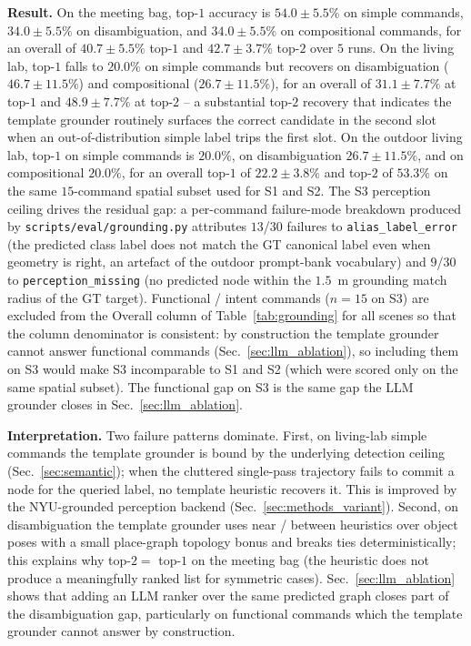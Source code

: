 \noindent\textbf{Result.}
On the meeting bag, top-$1$ accuracy is $54.0 \pm 5.5\%$ on simple
commands, $34.0 \pm 5.5\%$ on disambiguation, and $34.0 \pm 5.5\%$
on compositional commands, for an overall of $40.7 \pm 5.5\%$
top-$1$ and $42.7 \pm 3.7\%$ top-$2$ over $5$ runs.
On the living lab, top-$1$ falls to $20.0\%$ on simple commands but
recovers on disambiguation ($46.7 \pm 11.5\%$) and compositional
($26.7 \pm 11.5\%$), for an overall of $31.1 \pm 7.7\%$ at top-$1$
and $48.9 \pm 7.7\%$ at top-$2$ -- a substantial top-$2$ recovery
that indicates the template grounder routinely surfaces the correct
candidate in the second slot when an out-of-distribution simple
label trips the first slot. On the outdoor living lab, top-$1$
on simple commands is $20.0\%$, on disambiguation
$26.7 \pm 11.5\%$, and on compositional $20.0\%$, for an overall
top-$1$ of $22.2 \pm 3.8\%$ and top-$2$ of $53.3\%$ on the same
$15$-command spatial subset used for S1 and S2. The S3 perception
ceiling drives the residual gap: a per-command failure-mode
breakdown produced by \texttt{scripts/eval/grounding.py}
attributes $13$/$30$ failures to \texttt{alias\_label\_error} (the
predicted class label does not match the GT canonical label even
when geometry is right, an artefact of the outdoor prompt-bank
vocabulary) and $9$/$30$ to \texttt{perception\_missing} (no
predicted node within the $1.5$~m grounding match radius of the GT
target). Functional / intent commands ($n{=}15$ on S3) are
excluded from the Overall column of Table~\ref{tab:grounding} for
all scenes so that the column denominator is consistent: by
construction the template grounder cannot answer functional
commands (Sec.~\ref{sec:llm_ablation}), so including them on S3
would make S3 incomparable to S1 and S2 (which were scored only on
the same spatial subset). The functional gap on S3 is the same gap
the LLM grounder closes in Sec.~\ref{sec:llm_ablation}.

\noindent\textbf{Interpretation.}
Two failure patterns dominate. First, on living-lab simple commands
the template grounder is bound by the underlying detection ceiling
(Sec.~\ref{sec:semantic}); when the cluttered single-pass trajectory
fails to commit a node for the queried label, no template heuristic
recovers it. This is improved by the NYU-grounded perception
backend (Sec.~\ref{sec:methods_variant}). Second, on disambiguation
the template grounder uses near / between heuristics over object
poses with a small place-graph topology bonus and breaks ties
deterministically; this explains why top-$2 = $ top-$1$ on the
meeting bag (the heuristic does not produce a meaningfully ranked
list for symmetric cases). Sec.~\ref{sec:llm_ablation} shows that
adding an LLM ranker over the same predicted graph closes part of
the disambiguation gap, particularly on functional commands which
the template grounder cannot answer by construction.



